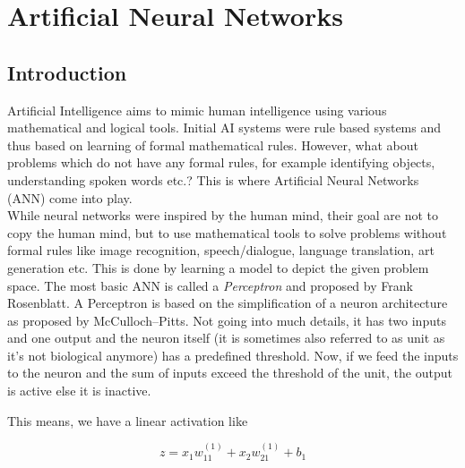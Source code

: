 \chapter{Artificial Neural Networks}
%
%
\section{Introduction}
%
%
Artificial Intelligence aims to mimic human intelligence using various mathematical and logical tools. Initial AI systems were rule based systems and thus based on learning of formal mathematical rules. However, what about problems which do not have any formal rules, for example identifying objects, understanding spoken words etc.? This is where Artificial Neural Networks (ANN) come into play. \\

While neural networks were inspired by the human mind, their goal are not to copy the human mind, but to use mathematical tools to solve problems without formal rules like image recognition, speech/dialogue, language translation, art generation etc. This is done by learning a model to depict the given problem space. The most basic ANN is called a \textit{Perceptron} and proposed by Frank Rosenblatt. A Perceptron is based on the simplification of a neuron architecture as proposed by McCulloch–Pitts. Not going into much details, it has two inputs and one output and the neuron itself (it is sometimes also referred to as unit as it's not biological anymore) has a predefined threshold. Now, if we feed the inputs to the neuron and the sum of inputs exceed the threshold of the unit, the output is active else it is inactive.

This means, we have a linear activation like 

$$ z = x_{1}w_{11}^{(1)} + x_{2}w_{21}^{(1)} + b_{1}$$


